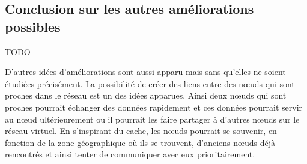 \subsection{Conclusion sur les autres améliorations possibles}
TODO

D'autres idées d'améliorations sont aussi apparu mais sans qu'elles ne soient étudiées précisément. La possibilité de créer des liens entre des nœuds qui sont proches dans le réseau est un des idées apparues. Ainsi deux nœuds qui sont proches pourrait échanger des données rapidement et ces données pourrait servir au nœud ultérieurement ou il pourrait les faire partager à d'autres nœuds sur le réseau virtuel. En s'inspirant du cache, les nœuds pourrait se souvenir, en fonction de la zone géographique où ils se trouvent, d'anciens nœuds déjà rencontrés et ainsi tenter de communiquer avec eux prioritairement.



